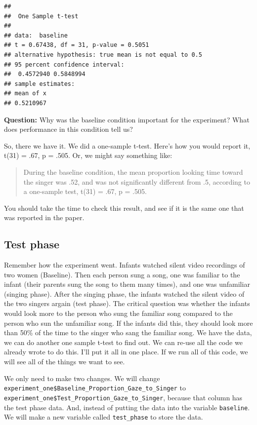 \documentclass[]{book}
\theoremstyle{definition}
\theoremstyle{definition}
\theoremstyle{definition}
\theoremstyle{remark}
\begin{document}
\begin{verbatim}
## 
##  One Sample t-test
## 
## data:  baseline
## t = 0.67438, df = 31, p-value = 0.5051
## alternative hypothesis: true mean is not equal to 0.5
## 95 percent confidence interval:
##  0.4572940 0.5848994
## sample estimates:
## mean of x 
## 0.5210967
\end{verbatim}

\textbf{Question:} Why was the baseline condition important for the
experiment? What does performance in this condition tell us?

So, there we have it. We did a one-sample t-test. Here's how you would
report it, t(31) = .67, p = .505. Or, we might say something like:

\begin{quote}
During the baseline condition, the mean proportion looking time toward
the singer was .52, and was not significantly different from .5,
according to a one-sample test, t(31) = .67, p = .505.
\end{quote}

You should take the time to check this result, and see if it is the same
one that was reported in the paper.

\subsection{Test phase}\label{test-phase}

Remember how the experiment went. Infants watched silent video
recordings of two women (Baseline). Then each person sung a song, one
was familiar to the infant (their parents sung the song to them many
times), and one was unfamiliar (singing phase). After the singing phase,
the infants watched the silent video of the two singers argain (test
phase). The critical question was whether the infants would look more to
the person who sung the familiar song compared to the person who sun the
unfamiliar song. If the infants did this, they should look more than
50\% of the time to the singer who sang the familiar song. We have the
data, we can do another one sample t-test to find out. We can re-use all
the code we already wrote to do this. I'll put it all in one place. If
we run all of this code, we will see all of the things we want to see.

We only need to make two changes. We will change
\texttt{experiment\_one\$Baseline\_Proportion\_Gaze\_to\_Singer} to
\texttt{experiment\_one\$Test\_Proportion\_Gaze\_to\_Singer}, because
that column has the test phase data. And, instead of putting the data
into the variable \texttt{baseline}. We will make a new variable called
\texttt{test\_phase} to store the data.
\end{document}
